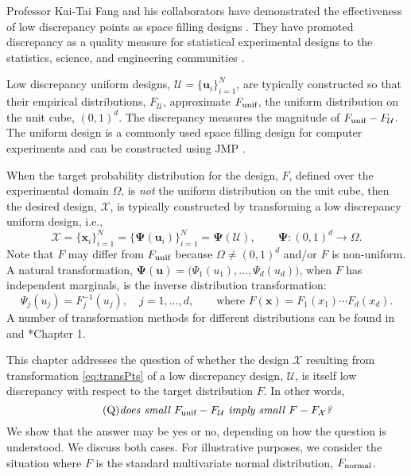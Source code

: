 \documentclass[graybox]{svmult}
\newcommand{\vx}{\boldsymbol{x}}
\newcommand{\vu}{\boldsymbol{u}}
\newcommand{\vPsi}{\boldsymbol{\Psi}}
\newcommand{\Udes}{\mathcal{U}}
\newcommand{\Xdes}{\mathcal{X}}
\newcommand{\Ftar}{F}
\newcommand{\cube}{\ensuremath{(0,1)^d}}
\newcommand{\unif}{\textup{unif}}
\newcommand{\normal}{\textup{normal}}
\begin{document}
Professor Kai-Tai Fang and his collaborators have demonstrated the effectiveness of low discrepancy points as space filling designs \cites{FangHic07a, FangEtal19a, FanLiSud06, FanWan94}. 
They have promoted discrepancy as a quality measure for statistical experimental designs to the statistics, science, and engineering communities \cites{FanMa01b, FanMaWin02, FanMuk00, FanMa01a}. 

Low discrepancy uniform designs, $\Udes = \{\vu_i\}_{i=1}^N$, are typically constructed so that their empirical distributions, $F_\Udes$, approximate $F_\unif$, the uniform distribution on the unit cube, \cube. 
The discrepancy measures the magnitude of $F_\unif-F_\Udes$. 
The uniform design is a commonly used space filling design for computer experiments \cite{FanLiSud06} and can be constructed using  JMP\textsuperscript{\textregistered} \cite{sall2012jmp}.

When the target probability distribution for the design, $\Ftar$, defined over the experimental domain $\Omega$, is \emph{not} the uniform distribution on the unit cube, then the desired design, $\Xdes$, is typically constructed by transforming a low discrepancy uniform design, i.e., 
\begin{equation} \label{eq:transPts}
\Xdes = \{\vx_i\}_{i=1}^N = \{\vPsi(\vu_i)\}_{i=1}^N = \vPsi(\Udes), \qquad \vPsi: \cube \to \Omega.
\end{equation}
Note that $\Ftar$ may differ from $F_\unif$ because $\Omega \ne \cube$ and/or $\Ftar$ is non-uniform.  
A natural transformation, $\vPsi(\vu)=\bigl(\Psi_1(u_1),\ldots,\Psi_d(u_d) \bigr)$, when $\Ftar$ has independent marginals, is the inverse distribution transformation:
\begin{equation}\label{eq:inverse}
\Psi_j(u_j) = F_j^{-1}(u_j), \quad j =1, \ldots, d, \qquad \text{where } \Ftar(\vx) = F_1(x_1) \cdots F_d(x_d).
\end{equation}
A number of transformation methods for different distributions can be found in \cite{DEVROYE200683} and \cite{FanWan94}*{Chapter 1}.

This chapter addresses the question of whether the design $\Xdes$ resulting from transformation \eqref{eq:transPts} of a low discrepancy design, $\Udes$, is itself low discrepancy with respect to the target distribution $\Ftar$. 
In other words, 
\begin{equation} \label{eq:BigQ} \tag{Q}
\text{\emph{does small $F_\unif - F_\Udes$ imply small $\Ftar - F_\Xdes$?}}
\end{equation}
We show that the answer may be yes or no, depending on how the question is understood.  
We discuss both cases.  
For illustrative purposes, we consider the situation where $\Ftar$ is the standard multivariate normal distribution, $F_\normal$.
\end{document}
